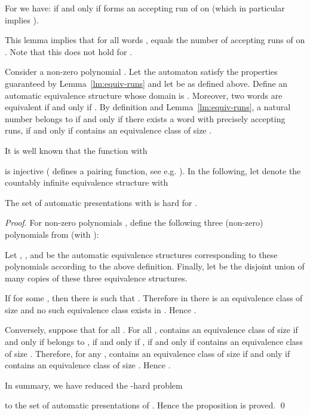 \documentclass[envcountsame]{llncs}
\begin{document}
\begin{lemma}
  For  we have:  if and only if 
  forms an accepting run of  on  (which in particular
  implies ).
\end{lemma}
This lemma implies that for all words ,  equals the number of accepting runs of  on .
Note that this does not hold for .

Consider a non-zero polynomial . Let the automaton 
satisfy the properties guaranteed by Lemma~\ref{lm:equiv-runs} and let
 be as defined above. Define an automatic equivalence
structure  whose domain is .  Moreover,
two words  are equivalent
if and only if . By definition and
Lemma~\ref{lm:equiv-runs}, a natural number  belongs to
 if and only if there exists a word  with
precisely  accepting runs, if and only if  contains an
equivalence class of size .

It is well known that the function  with

is injective ( defines a pairing function, see e.g. \cite{Hon06}).  In the
following, let  denote the countably infinite equivalence
structure with


\begin{proposition}\label{P-equiv}
  The set of automatic presentations  with  is
  hard for .
\end{proposition}

\begin{proof}
  For non-zero polynomials , define the following three (non-zero)
  polynomials from  (with ):
  
  Let , , and  be the automatic equivalence
  structures corresponding to these polynomials according to the above
  definition. Finally, let  be the disjoint union of
   many copies of these three equivalence structures.

  If  for some , then there is  such that .
  Therefore in  there is an equivalence class of size  and
  no such equivalence class exists in . Hence .

  Conversely, suppose that  for
  all .  For all ,  contains
  an equivalence class of size  if and only if 
  belongs to , if and
  only if , if and only if  contains an equivalence
  class of size . Therefore, for any ,  contains
  an equivalence class of size  if and only if  contains
  an equivalence class of size . Hence .

  In summary, we have reduced the -hard problem 
  
  to the set of automatic presentations of .
  Hence the proposition is proved.
\qed
\end{proof} 
\end{document}
